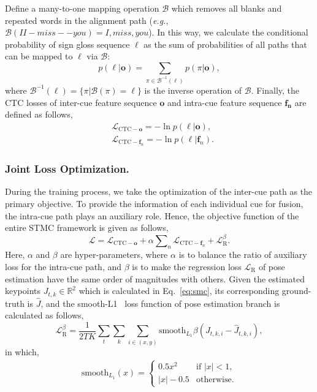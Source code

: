 \documentclass[letterpaper]{article} %
\def\lbf{{\boldsymbol\ell}}
\begin{document}
Define a many-to-one mapping operation $\mathcal{B}$ which removes all blanks and repeated words in the alignment path (\emph{e.g.}, $\mathcal{B}(II-miss--you)=I,miss,you$). In this way, we calculate the conditional probability of sign gloss sequence $\lbf$ as the sum of probabilities of all paths that can be mapped to $\lbf$ via $\mathcal{B}$:
\begin{equation}
    p(\lbf | \mathbf{o}) = \sum_{\pi \in \mathcal{B}^{-1}(\lbf)}  p(\pi | \mathbf{o}),
\end{equation}
where \(\mathcal{B}^{-1}(\lbf)\!=\!\{\pi | \mathcal{B}(\pi)\!=\!\lbf\}\) is the inverse operation of \(\mathcal{B}\). Finally, the CTC losses of inter-cue feature sequence $\mathbf{o}$ and intra-cue feature sequence $\mathbf{f_n}$ are defined as follows,
\begin{align}
    &\mathcal{L}_{\text{CTC}-\mathbf{o}} = -\ln{p(\lbf | \mathbf{o})}, \\
    &\mathcal{L}_{\text{CTC}-\mathbf{f}_n} = -\ln{p(\lbf | \mathbf{f}_n)}.
\end{align}


\subsubsection{Joint Loss Optimization.}
During the training process, we take the optimization of the inter-cue path as the primary objective. To provide the information of each individual cue for fusion, the intra-cue path plays an auxiliary role. Hence, the objective function of the entire STMC framework is given as follows,
\begin{equation} \label{eq:joint_loss}
    \mathcal{L} = \mathcal{L}_{\text{CTC}-\mathbf{o}}+\alpha \sum\nolimits_{n}{\mathcal{L}_{\text{CTC}-\mathbf{f}_n}} + \mathcal{L}_{\text{R}}^{\beta}.
\end{equation}
Here, $\alpha$ and $\beta$ are hyper-parameters, where $\alpha$ is to balance the ratio of auxiliary loss for the intra-cue path, and $\beta$ is to make the regression loss $\mathcal{L}_{\text{R}}$ of pose estimation have the same order of magnitudes with others.
Given the estimated keypoints $J_{t,k}\in\mathbb{R}^2$ which is calculated in Eq.~\ref{eq:smc}, its corresponding ground-truth is $\hat{J}$, and the smooth-L1~\cite{girshick2015fast} loss function of pose estimation branch is calculated as follows,
\begin{equation}
    \mathcal{L}_{\text{R}}^{\beta} = \frac{1}{2T\!K} \sum_t \sum_k \sum_{i\in(x,y)}  \text{smooth}_{L_1}\beta( J_{t,k,i}- \hat{J}_{t,k,i}),
\end{equation}
in which,
\begin{align}
    \text{smooth}_{L_1}(x) = \begin{cases}
          0.5 x^2  &\text{if $|x|<1$,} \\
          |x|-0.5  &\text{otherwise.}
        \end{cases}
\end{align}
\end{document}
